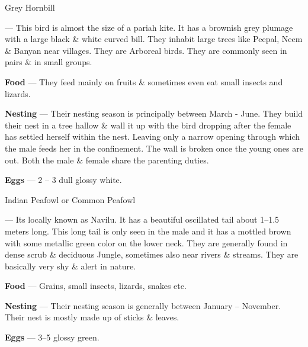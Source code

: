 \begin{bird}{Grey Hornbill}

 --- This bird is almost the size of a pariah kite. It has a brownish grey plumage with a large black \& white curved bill. They inhabit large trees like Peepal, Neem \& Banyan near villages. They are Arboreal birds. They are commonly seen in pairs \& in small groups.

{\large\bf Food} --- They feed mainly on fruits \& sometimes even eat small insects and lizards.

{\large\bf Nesting} --- Their nesting season is principally between March - June. They build their nest in a tree hallow \& wall it up with the bird dropping after the female has settled herself within the nest. Leaving only a narrow opening through which the male feeds her in the confinement. The wall is broken once the young ones are out. Both the male \& female share the parenting duties.

{\large\bf Eggs} --- 2 -- 3 dull glossy white.
\end{bird}


\begin{bird}{Indian Peafowl or Common Peafowl}

 --- Its locally known as Navilu. It has a beautiful oscillated tail about 1--1.5 meters long. This long tail is only seen in the male and it has a mottled brown with some metallic green color on the lower neck. They are generally found in dense scrub \& deciduous Jungle, sometimes also near rivers \& streams. They are basically very shy \& alert in nature.

{\large\bf Food} --- Grains, small insects, lizards, snakes etc.

{\large\bf Nesting} --- Their nesting season is generally between January -- November. Their nest is mostly made up of sticks \& leaves.

{\large\bf Eggs} --- 3--5 glossy green.
\end{bird}

